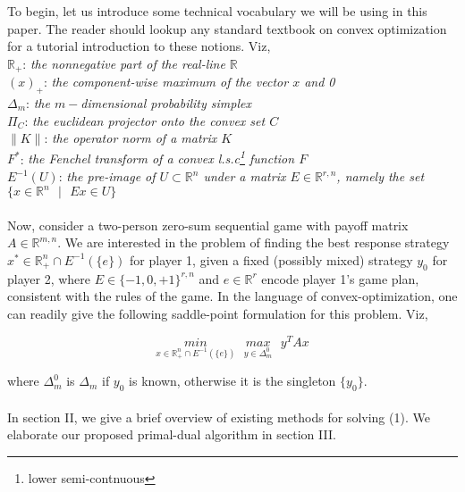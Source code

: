 \documentclass[a4paper,10pt,journal]{IEEEtran}
\begin{document}
To begin, let us introduce some technical vocabulary we will be using in this paper. The reader should lookup any standard textbook
on convex optimization for a tutorial introduction to these notions. Viz,\\
$\mathbb{R}_+$: \quad \textit{the nonnegative part of the real-line $\mathbb{R}$}\\
$(x)_+$: \quad \textit{the component-wise maximum of the vector $x$ and 0}\\
$\Delta_{m}$: \quad \textit{the $m-$dimensional probability simplex
}\\
$\Pi_C$: \quad \textit{the euclidean projector onto the convex set $C$}\\
$\|K\|$: \quad \textit{the operator norm of a matrix $K$}\\
$F^*$: \quad \textit{the Fenchel transform of a convex l.s.c\footnote{lower semi-contnuous} function $F$}\\
$E^{-1}(U)$: \quad \textit{the pre-image of $U \subset \mathbb{R}^n$ under a matrix $E \in \mathbb{R}^{r,n}$, namely the set $\{x \in \mathbb{R}^n\text{ }| \text{ }Ex \in U\}$}\\\\
Now, consider a two-person zero-sum sequential game with payoff matrix $A \in \mathbb{R}^{m,n}$. We are interested in the problem of
finding the best response strategy $x^* \in \mathbb{R}_{+}^n \cap E^{-1}(\{e\})$ for player 1, given a fixed
(possibly mixed) strategy $y_0$ for player 2, where $E \in \{-1, 0, +1\}^{r,n}$ and $e \in \mathbb{R}^r$ encode player
1's game plan, consistent with the rules of the game. In the language of convex-optimization, one can readily give the following saddle-point formulation for this problem. Viz,

\begin{equation}
  \underset{x \in \mathbb{R}_{+}^n \cap E^{-1}(\{e\})}{min}\text{ }\underset{y \in \Delta_{m}^0}{max}\text{ }y^TAx
\end{equation}

where $\Delta_{m}^0$ is $\Delta_{m}$ if $y_0$ is known, otherwise it is the singleton
$\{y_0\}$.\\\\

In section II, we give a brief overview of existing methods for solving (1). We elaborate our proposed primal-dual algorithm in section III.
\end{document}
